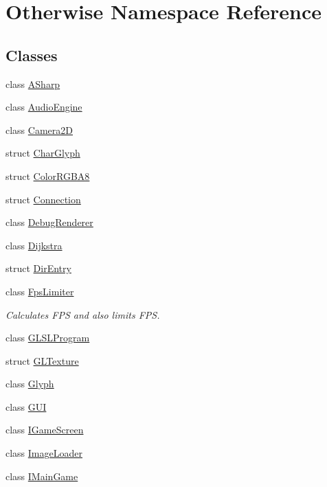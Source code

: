 \hypertarget{namespace_otherwise}{}\section{Otherwise Namespace Reference}
\label{namespace_otherwise}
\subsection*{Classes}
\begin{DoxyCompactItemize}
\item 
class \hyperlink{class_otherwise_1_1_a_sharp}{A\+Sharp}
\item 
class \hyperlink{class_otherwise_1_1_audio_engine}{Audio\+Engine}
\item 
class \hyperlink{class_otherwise_1_1_camera2_d}{Camera2D}
\item 
struct \hyperlink{struct_otherwise_1_1_char_glyph}{Char\+Glyph}
\item 
struct \hyperlink{struct_otherwise_1_1_color_r_g_b_a8}{Color\+R\+G\+B\+A8}
\item 
struct \hyperlink{struct_otherwise_1_1_connection}{Connection}
\item 
class \hyperlink{class_otherwise_1_1_debug_renderer}{Debug\+Renderer}
\item 
class \hyperlink{class_otherwise_1_1_dijkstra}{Dijkstra}
\item 
struct \hyperlink{struct_otherwise_1_1_dir_entry}{Dir\+Entry}
\item 
class \hyperlink{class_otherwise_1_1_fps_limiter}{Fps\+Limiter}
\begin{DoxyCompactList}\small\item\em Calculates F\+PS and also limits F\+PS. \end{DoxyCompactList}\item 
class \hyperlink{class_otherwise_1_1_g_l_s_l_program}{G\+L\+S\+L\+Program}
\item 
struct \hyperlink{struct_otherwise_1_1_g_l_texture}{G\+L\+Texture}
\item 
class \hyperlink{class_otherwise_1_1_glyph}{Glyph}
\item 
class \hyperlink{class_otherwise_1_1_g_u_i}{G\+UI}
\item 
class \hyperlink{class_otherwise_1_1_i_game_screen}{I\+Game\+Screen}
\item 
class \hyperlink{class_otherwise_1_1_image_loader}{Image\+Loader}
\item 
class \hyperlink{class_otherwise_1_1_i_main_game}{I\+Main\+Game}

\end{DoxyCompactItemize}
